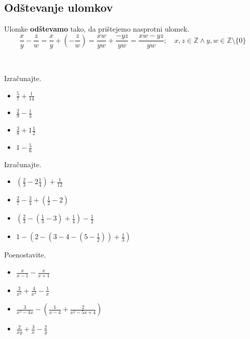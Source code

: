             \subsection*{Odštevanje ulomkov}
                Ulomke \textbf{odštevamo} tako, da prištejemo nasprotni ulomek.
                $$\dfrac{x}{y}-\dfrac{z}{w}=\dfrac{x}{y}+\left(-\dfrac{z}{w}\right)=\dfrac{xw}{yw}+\dfrac{-yz}{yw}=\dfrac{xw-yz}{yw}; \quad x,z\in\mathbb{Z}\land y,w\in\mathbb{Z}\setminus\{0\} $$
            

    
        
            ~\\

        
            \begin{naloga}
                Izračunajte.
                \begin{itemize}
                    \item $\frac{5}{7}+\frac{1}{14}$ 
                    \item $\frac{2}{9}-\frac{1}{3}$ 
                    \item $\frac{3}{8}+1\frac{1}{2}$ 
                    \item $1-\frac{5}{6}$ 
                \end{itemize}
            \end{naloga}
        

        
            \begin{naloga}
                Izračunajte.
                \begin{itemize}
                    \item $\left(\frac{2}{3}-2\frac{1}{4}\right)+\frac{1}{12}$ 
                    \item $\frac{2}{7}-\frac{3}{4}+\left(\frac{1}{2}-2\right)$ 
                    \item $\left(\frac{2}{3}-\left(\frac{1}{3}-3\right)+\frac{1}{4}\right)-\frac{1}{2}$ 
                    \item $1-\left(2-\left(3-4-\left(5-\frac{1}{2}\right)\right)+\frac{1}{3}\right)$ 
                \end{itemize}
            \end{naloga}
        


        
            \begin{naloga}
                Poenostavite.
                \begin{itemize}
                    \item $\frac{x}{x-1}-\frac{x}{x+1}$ 
                    \item $\frac{3}{x^2}+\frac{4}{x^3}-\frac{1}{x}$ 
                    \item $\frac{3}{x^2-4x}-\left(\frac{1}{x-4}+\frac{2}{x^2-5x+4}\right)$ 
                    \item $\frac{2}{xy}+\frac{3}{x}-\frac{2}{y}$ 
                \end{itemize}
            \end{naloga}
        



